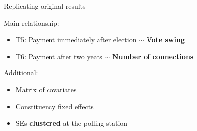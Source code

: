 \documentclass[10pt,table,aspectratio=169]{beamer}
\begin{document}
\begin{frame}[plain, label = two_dimensions]{Replicating original results}

Main relationship:

\begin{itemize}
  \item T5: Payment immediately after election $\sim$ \alert{\bf Vote swing}
  \item T6: Payment after two years $\sim$ \alert{\bf Number of connections}
\end{itemize}\pause

Additional:

\begin{itemize}
  \item Matrix of covariates
  \item Constituency fixed effects
  \item SEs \alert{\bf clustered} at the polling station
\end{itemize}\pause


\end{frame}
\end{document}
